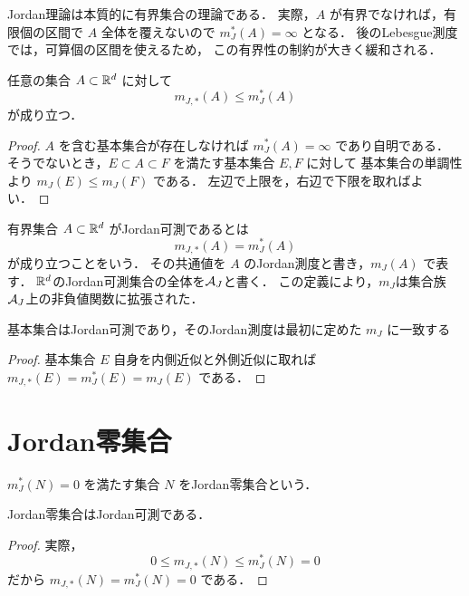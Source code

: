 \begin{remark}
Jordan理論は本質的に有界集合の理論である．
実際，$A$ が有界でなければ，有限個の区間で $A$ 全体を覆えないので
$m_J^*(A)=\infty$ となる．
後のLebesgue測度では，可算個の区間を使えるため，
この有界性の制約が大きく緩和される．
\end{remark}

\begin{proposition}
任意の集合 $A \subset \mathbb R^d$ に対して
\[
m_{J,*}(A) \le m_J^*(A)
\]
が成り立つ．
\end{proposition}
\begin{proof}
$A$ を含む基本集合が存在しなければ $m_J^*(A)=\infty$ であり自明である．
そうでないとき，$E \subset A \subset F$ を満たす基本集合 $E,F$ に対して
基本集合の単調性より $m_J(E) \le m_J(F)$ である．
左辺で上限を，右辺で下限を取ればよい．
\end{proof}

\begin{definition}
有界集合 $A \subset \mathbb R^d$ がJordan可測であるとは
\[
m_{J,*}(A) = m_J^*(A)
\]
が成り立つことをいう．
その共通値を $A$ のJordan測度と書き，$m_J(A)$ で表す．
$\mathbb R^d$のJordan可測集合の全体を$\mathcal A_J$と書く．
この定義により，$m_J$は集合族$\mathcal A_J$上の非負値関数に拡張された．
\end{definition}

\begin{example}
    基本集合はJordan可測であり，そのJordan測度は最初に定めた $m_J$ に一致する
\end{example}
\begin{proof}
    基本集合 $E$ 自身を内側近似と外側近似に取れば
    $m_{J,*}(E)=m_J^*(E)=m_J(E)$ である．
\end{proof}

\section{Jordan零集合}

\begin{definition}[Jordan零集合]
$m_J^*(N)=0$ を満たす集合 $N$ をJordan零集合という．    
\end{definition}

\begin{proposition}
    Jordan零集合はJordan可測である．
\end{proposition}
\begin{proof}
    実際，
    \[
    0 \le m_{J,*}(N) \le m_J^*(N)=0
    \]
    だから $m_{J,*}(N)=m_J^*(N)=0$ である．
\end{proof}

